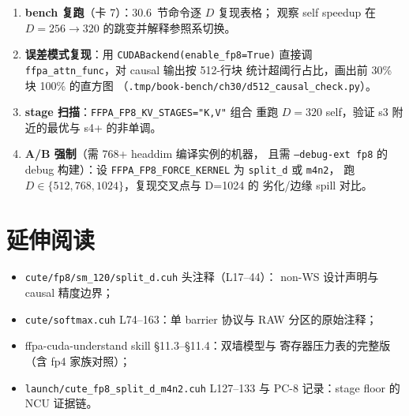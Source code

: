 \begin{enumerate}[itemsep=2pt,topsep=2pt]
  \item \textbf{bench 复跑}（卡 7）：30.6~节命令逐 $D$ 复现表格；
        观察 self speedup 在 $D=256\to320$ 的跳变并解释参照系切换。
  \item \textbf{误差模式复现}：用 \texttt{CUDABackend(enable\_fp8=True)}
        直接调 \texttt{ffpa\_attn\_func}，对 causal 输出按 512-行块
        统计超阈行占比，画出前 30\% 块 100\% 的直方图
        （\texttt{.tmp/book-bench/ch30/d512\_causal\_check.py}）。
  \item \textbf{stage 扫描}：\texttt{FFPA\_FP8\_KV\_STAGES="K,V"} 组合
        重跑 $D=320$ self，验证 s3 附近的最优与 s4+ 的非单调。
  \item \textbf{A/B 强制}（需 768+ headdim 编译实例的机器，
        且需 \texttt{--debug-ext fp8} 的 debug 构建）：设
        \texttt{FFPA\_FP8\_\allowbreak FORCE\_KERNEL} 为
        \texttt{split\_d} 或 \texttt{m4n2}，
        跑 $D\in\{512,768,1024\}$，复现交叉点与 D=1024 的
        劣化/边缘 spill 对比。
\end{enumerate}

\section*{延伸阅读}

\begin{itemize}[itemsep=0pt,topsep=2pt]
  \item \texttt{cute/fp8/sm\_120/split\_d.cuh} 头注释（L17--44）：
        non-WS 设计声明与 causal 精度边界；
  \item \texttt{cute/softmax.cuh} L74--163：单 barrier 协议与 RAW
        分区的原始注释；
  \item ffpa-cuda-understand skill \S11.3--\S11.4：双墙模型与
        寄存器压力表的完整版（含 fp4 家族对照）；
  \item \texttt{launch/cute\_fp8\_split\_d\_m4n2.cuh} L127--133 与
        PC-8 记录：stage floor 的 NCU 证据链。
\end{itemize}
